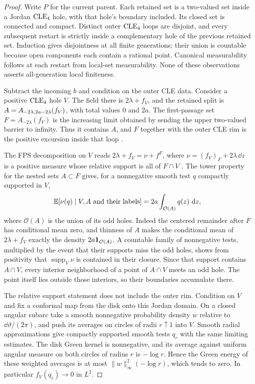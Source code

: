 \begin{proof}
Write \(P\) for the current parent. Each retained set is a two-valued set inside a Jordan $\mathrm{CLE}_4$
hole, with that hole's boundary included. Its closed set is
connected and compact. Distinct outer $\mathrm{CLE}_4$ loops are disjoint,
and every subsequent restart is strictly inside a complementary
hole of the previous retained set. Induction gives disjointness at
all finite generations; their union is countable because open
components each contain a rational point. Canonical measurability
follows at each restart from local-set measurability. None of these
observations asserts all-generation local finiteness.

Subtract the incoming \(b\) and condition on the outer CLE data.
Consider a positive \(\mathrm{CLE}_4\) hole \(V\). The field there is \(2\lambda+f_V\), and the
retained split is \(A=A_{-2\lambda,2a-2\lambda}(f_V)\), with
total values \(0\) and \(2a\). The first-passage set
\(F=A_{-2\lambda}(f_V)\) is the increasing limit obtained by sending
the upper two-valued barrier to infinity. Thus it contains \(A\),
and \(F\) together with the outer CLE rim is the positive excursion
inside that loop \cite{ALS2017,ALS2023}.

The FPS decomposition on \(V\) reads
\(2\lambda+f_V=\nu+f^F\), where
\(\nu=(f_V)_F+2\lambda\,\dd z\) is a positive measure whose relative
support is all of \(F\cap V\)
\cite[Definition~8 and Theorem~9]{ALS2023}.
The tower property for the nested sets \(A\subset F\) gives, for a
nonnegative smooth test \(q\) compactly supported in \(V\),
\begin{equation}
 \mathbb E[\nu(q)\mid V,A\text{ and their labels}]
       =2a\int_{\mathcal O(A)}q(z)\,\,\mathrm d z,
 \label{eq:fps-odd-support}
\end{equation}
where \(\mathcal O(A)\) is the union of its odd holes. Indeed the
centered remainder after \(F\) has conditional mean zero, and thinness
of \(A\) makes the conditional mean of \(2\lambda+f_V\) exactly the
density \(2a\mathbf 1_{\mathcal O(A)}\). A countable family of nonnegative
tests, multiplied by the event that their supports miss the odd holes,
shows from positivity that \(\operatorname{supp}_V\nu\) is contained
in their closure. Since that support contains \(A\cap V\), every
interior neighborhood of a point of \(A\cap V\) meets an odd hole.
The point itself lies outside those interiors, so their boundaries
accumulate there.

The relative support statement does not include the outer rim.
Condition on \(V\) and fix a conformal map from the disk onto this
Jordan domain. On a closed angular subarc take a smooth
nonnegative probability density $w$ relative to $\dd\vartheta/(2\pi)$,
and push its averages on circles of radii $r\uparrow1$ into $V$.
Smooth radial approximations give compactly supported smooth tests
$q_r$ with the same limiting estimates. The disk Green kernel is
nonnegative, and its average against uniform angular measure on both
circles of radius $r$ is $-\log r$. Hence the Green energy of these
weighted averages is at most $\|w\|_\infty^2(-\log r)$, which tends
to zero. In particular $f_V(q_r)\to0$ in $L^2$.


\end{proof}
